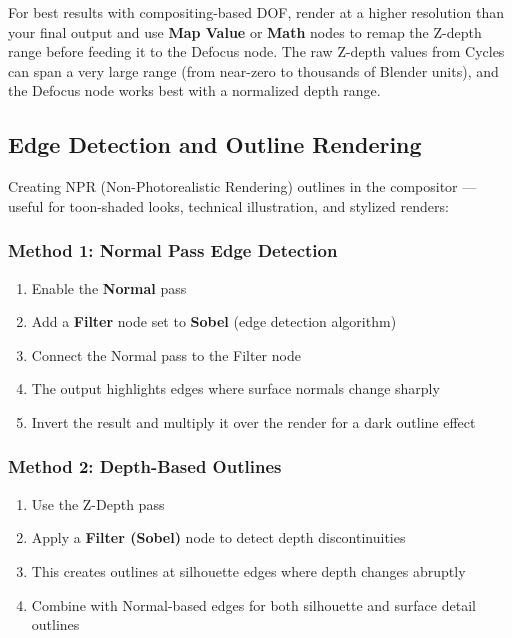 \begin{tipbox}
For best results with compositing-based DOF, render at a higher resolution than your final output and use \textbf{Map Value} or \textbf{Math} nodes to remap the Z-depth range before feeding it to the Defocus node. The raw Z-depth values from Cycles can span a very large range (from near-zero to thousands of Blender units), and the Defocus node works best with a normalized depth range.
\end{tipbox}

\subsection{Edge Detection and Outline Rendering}

Creating NPR (Non-Photorealistic Rendering) outlines in the compositor --- useful for toon-shaded looks, technical illustration, and stylized renders:

\subsubsection{Method 1: Normal Pass Edge Detection}

\begin{enumerate}[leftmargin=2em]
  \item Enable the \textbf{Normal} pass
  \item Add a \textbf{Filter} node set to \textbf{Sobel} (edge detection algorithm)
  \item Connect the Normal pass to the Filter node
  \item The output highlights edges where surface normals change sharply
  \item Invert the result and multiply it over the render for a dark outline effect
\end{enumerate}

\subsubsection{Method 2: Depth-Based Outlines}

\begin{enumerate}[leftmargin=2em]
  \item Use the Z-Depth pass
  \item Apply a \textbf{Filter (Sobel)} node to detect depth discontinuities
  \item This creates outlines at silhouette edges where depth changes abruptly
  \item Combine with Normal-based edges for both silhouette and surface detail outlines
\end{enumerate}

